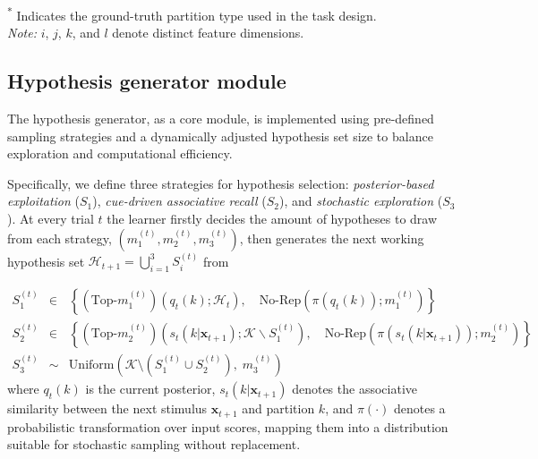 \begin{table}[H]
\begin{threeparttable}
\begin{tabularx}{\textwidth}{l l l l}
\bottomrule
\end{tabularx}
\begin{tablenotes}
\footnotesize
\textsuperscript{*} Indicates the ground-truth partition type used in the task design.\\
\textit{Note:} $i$, $j$, $k$, and $l$ denote distinct feature dimensions.
\end{tablenotes}
\label{tab:3}
\end{threeparttable}
\end{table}



\subsection{Hypothesis generator module} 

The hypothesis generator, as a core module, is implemented using pre-defined sampling strategies and a dynamically adjusted hypothesis set size to balance exploration and computational efficiency.

Specifically, we define three strategies for hypothesis selection: \textit{posterior-based exploitation} ($S_1$), \textit{cue-driven associative recall} ($S_2$), and \textit{stochastic exploration} ($S_3$). At every trial $t$ the learner firstly decides the amount of hypotheses to draw from each strategy, $(m_1^{(t)}, m_2^{(t)}, m_3^{(t)})$, then generates the next working hypothesis set $\mathcal H_{t+1}=\bigcup_{i=1}^3S_i^{(t)}$ from
\addtocounter{equation}{1}
\begin{eqnarray}
    S_1^{(t)} &\in&\left\{(\text{Top-}m_1^{(t)})(q_t(k);\mathcal{H}_{t}),\quad \text{No-Rep}(\pi(q_t(k)); m_1^{(t)})\right\}\\
   S_2^{(t)} &\in&\left\{(\text{Top-}m_2^{(t)})(s_t(k|\mathbf{x}_{t+1});\mathcal{K}\backslash{S_1^{(t)}}),\quad \text{No-Rep}(\pi(s_t(k|\mathbf{x}_{t+1})); m_2^{(t)})\right\}\\
   S_3^{(t)} &\sim&\text{Uniform}\!\left(\mathcal K\setminus(S_1^{(t)}\cup S_2^{(t)}),\;m_3^{(t)}\right) 
\end{eqnarray}
where $q_t(k)$ is the current posterior,  $s_t(k|\mathbf{x}_{t+1})$ denotes the associative similarity between the next stimulus $\mathbf x_{t+1}$ and partition $k$, and $\pi(\cdot)$ denotes a probabilistic transformation over input scores, mapping them into a distribution suitable for stochastic sampling without replacement.


